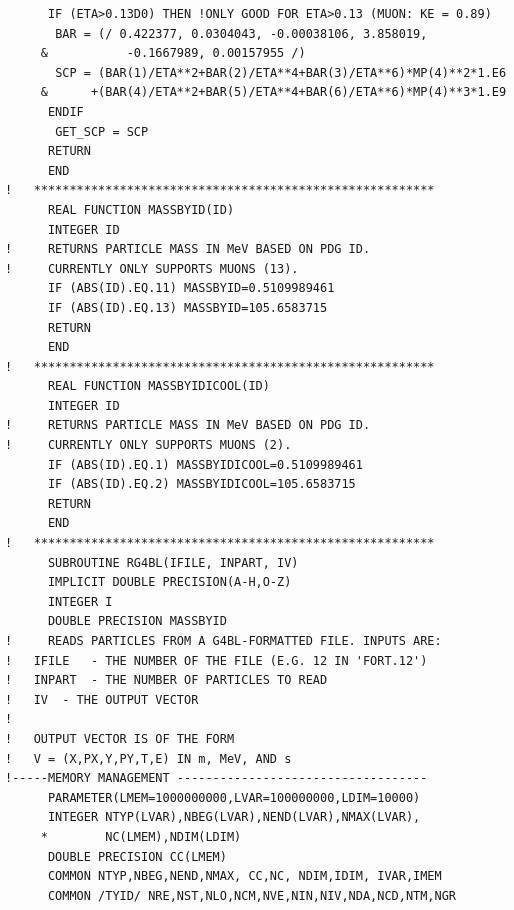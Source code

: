 \begin{lstlisting}
      IF (ETA>0.13D0) THEN !ONLY GOOD FOR ETA>0.13 (MUON: KE = 0.89)
       BAR = (/ 0.422377, 0.0304043, -0.00038106, 3.858019, 
     &           -0.1667989, 0.00157955 /)
       SCP = (BAR(1)/ETA**2+BAR(2)/ETA**4+BAR(3)/ETA**6)*MP(4)**2*1.E6
     &      +(BAR(4)/ETA**2+BAR(5)/ETA**4+BAR(6)/ETA**6)*MP(4)**3*1.E9
      ENDIF
       GET_SCP = SCP
      RETURN
      END
!   ********************************************************
      REAL FUNCTION MASSBYID(ID)
      INTEGER ID
!     RETURNS PARTICLE MASS IN MeV BASED ON PDG ID.
!     CURRENTLY ONLY SUPPORTS MUONS (13).
      IF (ABS(ID).EQ.11) MASSBYID=0.5109989461
      IF (ABS(ID).EQ.13) MASSBYID=105.6583715
      RETURN
      END     
!   ********************************************************
      REAL FUNCTION MASSBYIDICOOL(ID)
      INTEGER ID
!     RETURNS PARTICLE MASS IN MeV BASED ON PDG ID.
!     CURRENTLY ONLY SUPPORTS MUONS (2).
      IF (ABS(ID).EQ.1) MASSBYIDICOOL=0.5109989461
      IF (ABS(ID).EQ.2) MASSBYIDICOOL=105.6583715
      RETURN
      END
!   ********************************************************
      SUBROUTINE RG4BL(IFILE, INPART, IV)
      IMPLICIT DOUBLE PRECISION(A-H,O-Z)
      INTEGER I
      DOUBLE PRECISION MASSBYID
!     READS PARTICLES FROM A G4BL-FORMATTED FILE. INPUTS ARE:
!   IFILE   - THE NUMBER OF THE FILE (E.G. 12 IN 'FORT.12')
!   INPART  - THE NUMBER OF PARTICLES TO READ
!   IV  - THE OUTPUT VECTOR
!
!   OUTPUT VECTOR IS OF THE FORM 
!   V = (X,PX,Y,PY,T,E) IN m, MeV, AND s
!-----MEMORY MANAGEMENT -----------------------------------
      PARAMETER(LMEM=1000000000,LVAR=100000000,LDIM=10000)
      INTEGER NTYP(LVAR),NBEG(LVAR),NEND(LVAR),NMAX(LVAR),
     *        NC(LMEM),NDIM(LDIM)
      DOUBLE PRECISION CC(LMEM)
      COMMON NTYP,NBEG,NEND,NMAX, CC,NC, NDIM,IDIM, IVAR,IMEM
      COMMON /TYID/ NRE,NST,NLO,NCM,NVE,NIN,NIV,NDA,NCD,NTM,NGR


\end{lstlisting}
